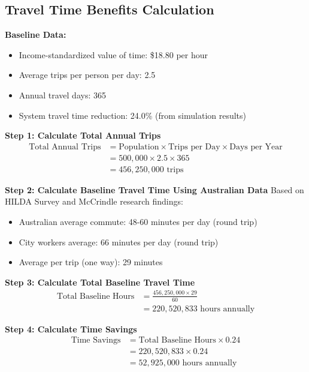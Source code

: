 \subsection{Travel Time Benefits Calculation}

\textbf{Baseline Data:}
\begin{itemize}
    \item Income-standardized value of time: \$18.80 per hour \citep{TfNSW_2025}
    \item Average trips per person per day: 2.5
    \item Annual travel days: 365
    \item System travel time reduction: 24.0\% (from simulation results)
\end{itemize}

\textbf{Step 1: Calculate Total Annual Trips}
\begin{align}
\text{Total Annual Trips} &= \text{Population} \times \text{Trips per Day} \times \text{Days per Year} \\
&= 500,000 \times 2.5 \times 365 \\
&= 456,250,000 \text{ trips}
\end{align}

\textbf{Step 2: Calculate Baseline Travel Time Using Australian Data}
Based on HILDA Survey and McCrindle research findings:
\begin{itemize}
    \item Australian average commute: 48-60 minutes per day (round trip) \citep{McCrindle_2022}
    \item City workers average: 66 minutes per day (round trip) \citep{HILDA_2019}
    \item Average per trip (one way): 29 minutes 
\end{itemize}

\textbf{Step 3: Calculate Total Baseline Travel Time}
\begin{align}
\text{Total Baseline Hours} &= \frac{456,250,000 \times 29}{60} \\
&= 220,520,833 \text{ hours annually}
\end{align}

\textbf{Step 4: Calculate Time Savings}
\begin{align}
\text{Time Savings} &= \text{Total Baseline Hours} \times 0.24 \\
&= 220,520,833  \times 0.24 \\
&= 52,925,000 \text{ hours annually}
\end{align}

